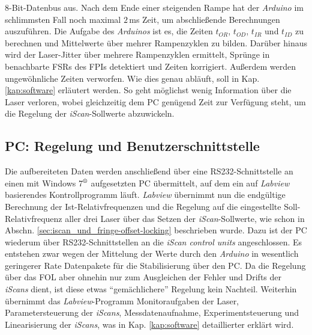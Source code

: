 8-Bit-Datenbus aus. Nach dem Ende einer steigenden Rampe hat der
\textit{Arduino} im schlimmsten Fall noch maximal $2\,$ms Zeit, um abschließende Berechnungen
auszuführen. Die Aufgabe des \textit{Arduinos} ist es, die Zeiten $t_{OR}$,
$t_{OD}$, $t_{IR}$ und $t_{ID}$ zu berechnen und Mittelwerte über mehrer Rampenzyklen zu
bilden. Darüber hinaus wird der Laser-Jitter über mehrere Rampenzyklen
ermittelt, Sprünge in benachbarte FSRs des FPIs detektiert und Zeiten
korrigiert. Außerdem werden ungewöhnliche Zeiten verworfen. Wie dies genau
abläuft, soll in Kap. \ref{kap:software} erläutert werden. So geht möglichst
wenig Information über die Laser verloren, wobei gleichzeitig dem PC genügend
Zeit zur Verfügung steht, um die Regelung der \textit{iScan}-Sollwerte
abzuwickeln.

\subsection{PC: Regelung und
Benutzerschnittstelle}\label{subsec:pc_regelung_benutzerschnittstelle}
Die aufbereiteten Daten werden anschließend über eine RS232-Schnittstelle an einen mit Windows
7$^\text{\textregistered}$ aufgesetzten PC übermittelt, auf dem ein auf
\textit{Labview} basierendes Kontrollprogramm läuft. \textit{Labview} übernimmt nun die endgültige Berechnung der
Ist-Relativfrequenzen und die Regelung auf die eingestellte Soll-Relativfrequenz
aller drei Laser über das Setzen der \textit{iScan}-Sollwerte, wie schon in
Abschn.
\ref{sec:iscan_und_fringe-offset-locking} beschrieben wurde.
Dazu ist der PC wiederum über RS232-Schnittstellen an die \textit{iScan control
units} angeschlossen. Es entstehen zwar wegen der Mittelung der Werte durch den
\textit{Arduino} in wesentlich geringerer Rate Datenpakete für die Stabilisierung über den PC. Da
die Regelung über das FOL aber ohnehin nur zum Ausgleichen der Fehler und Drifts
der \textit{iScans} dient, ist diese etwas "`gemächlichere"' Regelung kein
Nachteil.
Weiterhin übernimmt das \textit{Labview}-Programm Monitoraufgaben der Laser,
Parametersteuerung der \textit{iScans}, Messdatenaufnahme, Experimentsteuerung
und Linearisierung der \textit{iScans}, was in Kap. \ref{kap:software}
detaillierter erklärt wird.\par

